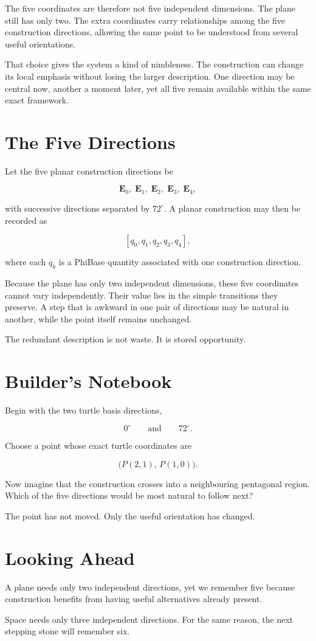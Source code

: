 The five coordinates are therefore not five independent dimensions. The plane still has only two. The extra coordinates carry relationships among the five construction directions, allowing the same point to be understood from several useful orientations.

That choice gives the system a kind of nimbleness. The construction can change its local emphasis without losing the larger description. One direction may be central now, another a moment later, yet all five remain available within the same exact framework.

\section*{The Five Directions}

Let the five planar construction directions be

\[
\mathbf{E}_0,\;
\mathbf{E}_1,\;
\mathbf{E}_2,\;
\mathbf{E}_3,\;
\mathbf{E}_4,
\]

with successive directions separated by \(72^\circ\). A planar construction may then be recorded as

\[
[q_0,q_1,q_2,q_3,q_4],
\]

where each \(q_k\) is a PhiBase quantity associated with one construction direction.

Because the plane has only two independent dimensions, these five coordinates cannot vary independently. Their value lies in the simple transitions they preserve. A step that is awkward in one pair of directions may be natural in another, while the point itself remains unchanged.

The redundant description is not waste. It is stored opportunity.

\section*{Builder's Notebook}

Begin with the two turtle basis directions,

\[
0^\circ
\qquad\text{and}\qquad
72^\circ.
\]

Choose a point whose exact turtle coordinates are

\[
\bigl(P(2,1),\,P(1,0)\bigr).
\]

Now imagine that the construction crosses into a neighbouring pentagonal region. Which of the five directions would be most natural to follow next?

The point has not moved. Only the useful orientation has changed.

\section*{Looking Ahead}

A plane needs only two independent directions, yet we remember five because construction benefits from having useful alternatives already present.

Space needs only three independent directions. For the same reason, the next stepping stone will remember six.
